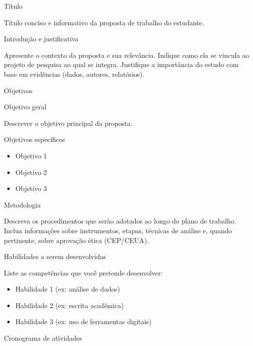 \documentclass[
  letterpaper,
  DIV=11,
  numbers=noendperiod]{scrreprt}
\providecommand{\tightlist}{%
  \setlength{\itemsep}{0pt}\setlength{\parskip}{0pt}}
\begin{document}
Título

Título conciso e informativo da proposta de trabalho do estudante.

Introdução e justificativa

Apresente o contexto da proposta e sua relevância. Indique como ela se
vincula ao projeto de pesquisa ao qual se integra. Justifique a
importância do estudo com base em evidências (dados, autores,
relatórios).

Objetivos

Objetivo geral

Descrever o objetivo principal da proposta.

Objetivos específicos

\begin{itemize}
\tightlist
\item
  Objetivo 1
\item
  Objetivo 2
\item
  Objetivo 3
\end{itemize}

Metodologia

Descreva os procedimentos que serão adotados ao longo do plano de
trabalho. Inclua informações sobre instrumentos, etapas, técnicas de
análise e, quando pertinente, sobre aprovação ética (CEP/CEUA).

Habilidades a serem desenvolvidas

Liste as competências que você pretende desenvolver:

\begin{itemize}
\tightlist
\item
  Habilidade 1 (ex: análise de dados)
\item
  Habilidade 2 (ex: escrita acadêmica)
\item
  Habilidade 3 (ex: uso de ferramentas digitais)
\end{itemize}

Cronograma de atividades
\end{document}
